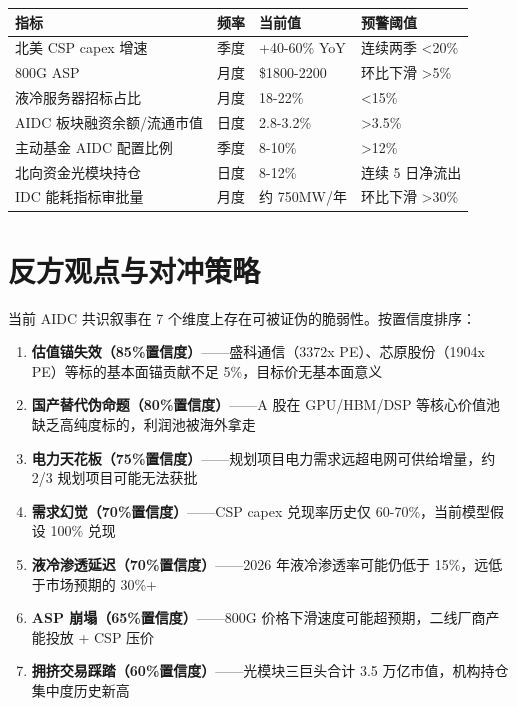 \begin{exhibitbox}[高频监测指标体系]
\begin{tabularx}{\textwidth}{L{2.5cm}L{2.0cm}L{2.0cm}X}
\toprule
\textbf{指标} & \textbf{频率} & \textbf{当前值} & \textbf{预警阈值}\\
\midrule
北美 CSP capex 增速 & 季度 & +40-60\% YoY & 连续两季 <20\%\\
800G ASP & 月度 & \$1800-2200 & 环比下滑 >5\%\\
液冷服务器招标占比 & 月度 & 18-22\% & <15\%\\
AIDC 板块融资余额/流通市值 & 日度 & 2.8-3.2\% & >3.5\%\\
主动基金 AIDC 配置比例 & 季度 & 8-10\% & >12\%\\
北向资金光模块持仓 & 日度 & 8-12\% & 连续 5 日净流出\\
IDC 能耗指标审批量 & 月度 & 约 750MW/年 & 环比下滑 >30\%\\
\bottomrule
\end{tabularx}
\end{exhibitbox}

\section{反方观点与对冲策略}

\begin{houseviewbox}[七大反方论点与置信度]
当前 AIDC 共识叙事在 7 个维度上存在可被证伪的脆弱性。按置信度排序：
\begin{enumerate}
\item \textbf{估值锚失效（85\%置信度）}——盛科通信（3372x PE）、芯原股份（1904x PE）等标的基本面锚贡献不足 5\%，目标价无基本面意义
\item \textbf{国产替代伪命题（80\%置信度）}——A 股在 GPU/HBM/DSP 等核心价值池缺乏高纯度标的，利润池被海外拿走
\item \textbf{电力天花板（75\%置信度）}——规划项目电力需求远超电网可供给增量，约 2/3 规划项目可能无法获批
\item \textbf{需求幻觉（70\%置信度）}——CSP capex 兑现率历史仅 60-70\%，当前模型假设 100\% 兑现
\item \textbf{液冷渗透延迟（70\%置信度）}——2026 年液冷渗透率可能仍低于 15\%，远低于市场预期的 30\%+
\item \textbf{ASP 崩塌（65\%置信度）}——800G 价格下滑速度可能超预期，二线厂商产能投放 + CSP 压价
\item \textbf{拥挤交易踩踏（60\%置信度）}——光模块三巨头合计 3.5 万亿市值，机构持仓集中度历史新高
\end{enumerate}
\end{houseviewbox}

